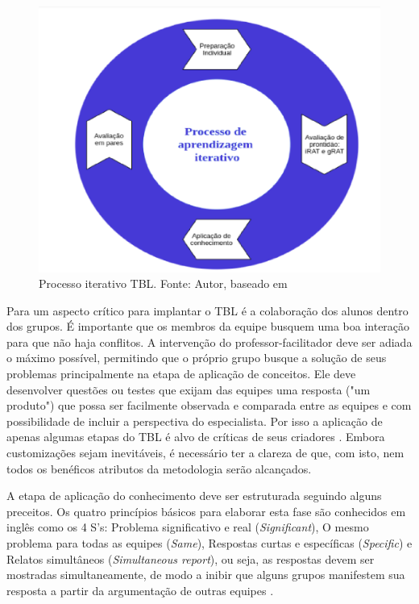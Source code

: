 \begin{figure}[h!]
	\centering
  \includegraphics[keepaspectratio=true,scale=0.5]{figuras/tbl1.eps}
  \caption[Processo iterativo TBL.]{Processo iterativo TBL. Fonte: Autor, baseado em \cite{bollela}}
	\label{fig:tbl1}
\end{figure}

Para \cite{bollela} um aspecto crítico para implantar o TBL é a colaboração dos alunos dentro dos grupos. É importante que os membros da equipe busquem uma boa interação para que não haja conflitos. A intervenção do professor-facilitador deve ser adiada o máximo possível, permitindo que o próprio grupo busque a solução de seus problemas principalmente na etapa de aplicação de conceitos. Ele deve desenvolver questões ou testes que exijam das equipes uma resposta ("um produto") que possa ser facilmente observada e comparada entre as equipes e com possibilidade de incluir a perspectiva do especialista. Por isso a aplicação de apenas algumas etapas do TBL é alvo de críticas de seus criadores \cite{sweet}. Embora customizações sejam inevitáveis, é necessário ter a clareza de que, com isto, nem todos os benéficos atributos da metodologia serão alcançados.

A etapa de aplicação do conhecimento deve ser estruturada seguindo alguns preceitos. Os quatro princípios básicos para elaborar esta fase são conhecidos em inglês como os 4 S’s: Problema significativo e real (\textit{Significant}), O mesmo problema para todas as equipes (\textit{Same}), Respostas curtas e específicas (\textit{Specific}) e Relatos simultâneos (\textit{Simultaneous report}), ou seja, as respostas devem ser mostradas simultaneamente, de modo a inibir que alguns grupos manifestem sua resposta a partir da argumentação de outras equipes \cite{bollela}.

